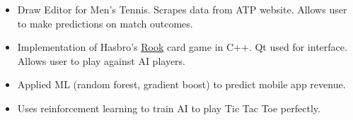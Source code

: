 

\begin{itemize}
\item Draw Editor for Men's Tennis. Scrapes data from ATP website. Allows user to make predictions on match outcomes.
\end{itemize}

\divider


\begin{itemize}
\item Implementation of Hasbro's \href{https://en.wikipedia.org/wiki/Rook_(card_game)}{Rook} card game in C++. Qt used for interface. Allows user to play against AI players.
\end{itemize}

\divider


\begin{itemize}
\item Applied ML (random forest, gradient boost) to predict mobile app revenue.
\end{itemize}

\divider


\begin{itemize}
\item Uses reinforcement learning to train AI to play Tic Tac Toe perfectly.
\end{itemize}




